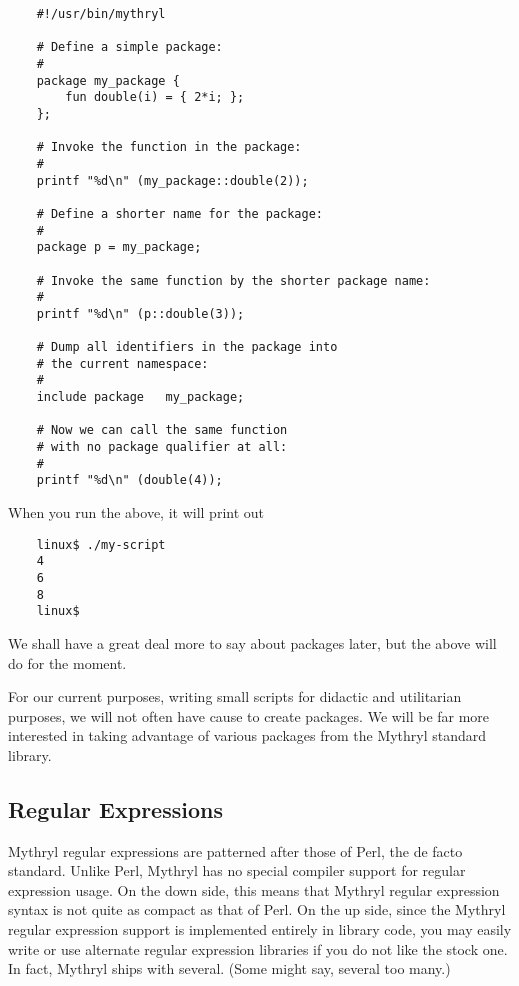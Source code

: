 \begin{verbatim}
    #!/usr/bin/mythryl

    # Define a simple package:
    #
    package my_package {
        fun double(i) = { 2*i; };
    };

    # Invoke the function in the package:
    #
    printf "%d\n" (my_package::double(2));

    # Define a shorter name for the package:
    #
    package p = my_package;

    # Invoke the same function by the shorter package name:
    #
    printf "%d\n" (p::double(3));

    # Dump all identifiers in the package into
    # the current namespace:
    #
    include package   my_package;

    # Now we can call the same function
    # with no package qualifier at all:
    #
    printf "%d\n" (double(4));
\end{verbatim}

When you run the above, it will print out

\begin{verbatim}
    linux$ ./my-script
    4
    6
    8
    linux$
\end{verbatim}

We shall have a great deal more to say about packages later, 
but the above will do for the moment.

For our current purposes, writing small scripts for didactic and 
utilitarian purposes, we will not often have cause to create packages. 
We will be far more interested in taking advantage of various packages 
from the Mythryl standard library.


\cutend*

\subsection{Regular Expressions}
\label{section:tut:bare-essentials:regex}

Mythryl regular expressions are patterned after those of Perl, the 
de facto standard.  Unlike Perl, Mythryl has no special compiler 
support for regular expression usage.  On the down side, this means 
that Mythryl regular expression syntax is not quite as compact as 
that of Perl.  On the up side, since the Mythryl regular expression support 
is implemented entirely in library code, you may easily write or use 
alternate regular expression libraries if you do not like the stock one. 
In fact, Mythryl ships with several.  (Some might say, several too many.) 

